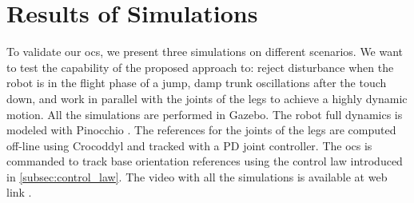 \documentclass[letterpaper, 10 pt, conference]{ieeeconf}  %
\begin{document}
\section{Results of Simulations}
To validate our \gls{ocs}, we present three simulations on different scenarios. We want to test the capability of the proposed approach to: 
reject disturbance when the robot is in the flight phase of a jump, damp trunk oscillations after the touch down, 
and work in parallel with the joints of the legs to achieve a highly dynamic motion. 
All the simulations are performed in Gazebo. The robot full dynamics is modeled with Pinocchio \cite{carpentier2019pinocchio}. The references for the joints of the legs are computed off-line using Crocoddyl \cite{mastalli2020crocoddyl} and tracked with a PD joint controller. The \gls{ocs} is commanded to 
track base orientation references using the control law introduced in \ref{subsec:control_law}. The video with all the simulations is available at web link .
\end{document}
